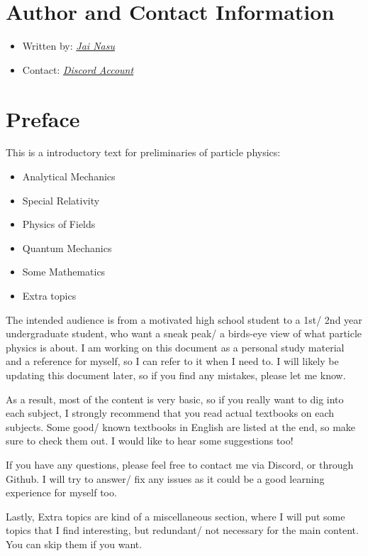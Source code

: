 \section*{Author and Contact Information}
\begin{itemize}
  \item Written by: \href{https://github.com/JaiNasu}{\emph{Jai Nasu}}
  \item Contact: \href{https://discordapp.com/users/475766542181859331}{\emph{Discord Account}}
\end{itemize}

\section*{Preface}

This is a introductory text for preliminaries of particle physics:
\begin{itemize}
  \item Analytical Mechanics
  \item Special Relativity
  \item Physics of Fields
  \item Quantum Mechanics
  \item Some Mathematics
  \item Extra topics
\end{itemize}

The intended audience is from a motivated high school student to a 1st/ 2nd year undergraduate student, who want a sneak peak/ a birds-eye view of what particle physics is about.
I am working on this document as a personal study material and a reference for myself, so I can refer to it when I need to.
I will likely be updating this document later, so if you find any mistakes, please let me know.

As a result, most of the content is very basic, so if you really want to dig into each subject, I strongly recommend that you read actual textbooks on each subjects.
Some good/ known textbooks in English are listed at the end, so make sure to check them out. I would like to hear some suggestions too!

If you have any questions, please feel free to contact me via Discord, or through Github.
I will try to answer/ fix any issues as it could be a good learning experience for myself too.

Lastly, Extra topics are kind of a miscellaneous section, where I will put some topics that I find interesting, but redundant/ not necessary for the main content. You can skip them if you want.

